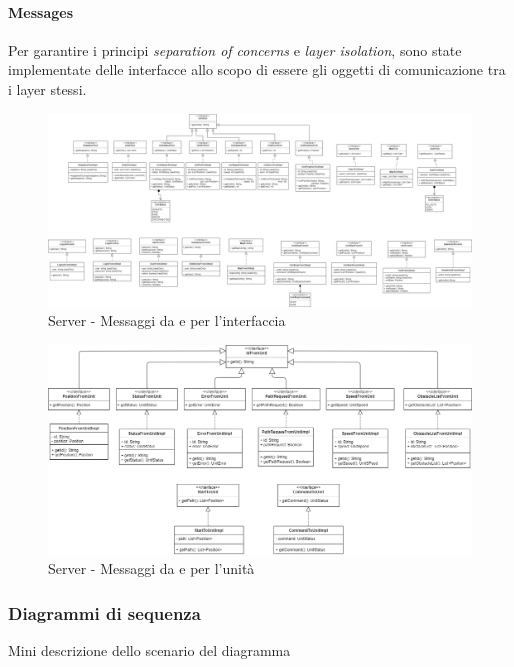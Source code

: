 \paragraph{Messages}
Per garantire i principi \textit{separation of concerns} e \textit{layer isolation}, sono state implementate delle interfacce allo scopo di essere gli oggetti di comunicazione tra i layer stessi.
\begin{figure}[H]
	\centering
	\includegraphics[width=18cm]{img/server_from_to_ui.png}
	\caption{Server - Messaggi da e per l'interfaccia}
\end{figure}
\begin{figure}[H]
	\centering
	\includegraphics[width=18cm]{img/server_from_to_unit.png}
	\caption{Server - Messaggi da e per l'unità}
\end{figure}

\subsubsection{Diagrammi di sequenza}
Mini descrizione dello scenario del diagramma
